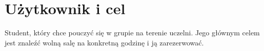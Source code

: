 \section{Użytkownik i cel}\label{sec:uzytkownik}

Student, który chce pouczyć się w grupie na terenie uczelni. Jego głównym celem jest znaleźć wolną salę na konkretną godzinę i ją zarezerwować.